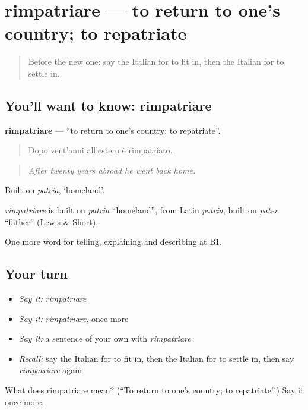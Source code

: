 \section[rimpatriare]{rimpatriare — to return to one's country; to repatriate}

\label{lesson:IT-C310-rimpatriare}



\begin{quote}
Before the new one: say the Italian for to fit in, then the Italian for to settle in.
\end{quote}

\subsection*{You'll want to know: rimpatriare}
\textbf{rimpatriare} — \textquotedblleft{}to return to one's country; to repatriate\textquotedblright{}.

\begin{quote}
Dopo vent'anni all'estero è rimpatriato.
\end{quote}

\begin{quote}
\emph{After twenty years abroad he went back home.}
\end{quote}

Built on \emph{patria}, ‘homeland’.

\begin{cousinweb}
\emph{rimpatriare} is built on \emph{patria} \textquotedblleft{}homeland\textquotedblright{}, from Latin \emph{patria}, built on \emph{pater} \textquotedblleft{}father\textquotedblright{} (Lewis \& Short).
\end{cousinweb}

\begin{grammarlens}[title={What you've built}]
One more word for telling, explaining and describing at B1.
\end{grammarlens}

\subsection*{Your turn}
\begin{itemize}
\raggedright
  \item \emph{Say it:} \emph{rimpatriare}
  \item \emph{Say it:} \emph{rimpatriare}, once more
  \item \emph{Say it:} a sentence of your own with \emph{rimpatriare}
  \item \emph{Recall:} say the Italian for to fit in, then the Italian for to settle in, then say \emph{rimpatriare} again
\end{itemize}

\begin{tcolorbox}[breakable,colback=teal!4,colframe=teal!35!black,title={Before you move on}]
What does rimpatriare mean? (\textquotedblleft{}To return to one's country; to repatriate\textquotedblright{}.) Say it once more.
\end{tcolorbox}
